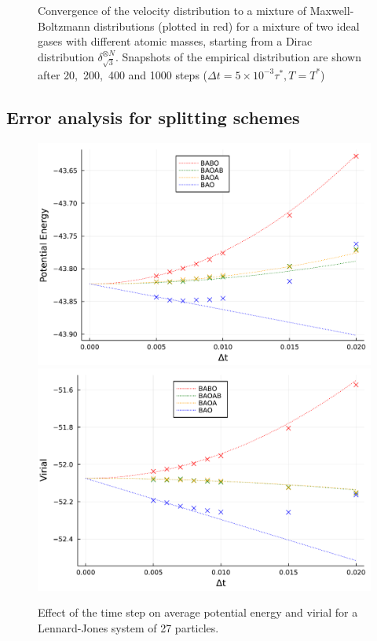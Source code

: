 \begin{figure}[htbp]
\begin{center}
          \caption{ \label{fig:velocity_histograms}
            Convergence of the velocity distribution to a mixture of Maxwell-Boltzmann distributions (plotted in red) for a mixture of two ideal gases with different atomic masses, starting from a Dirac distribution $\delta_{\sqrt 3}^{\otimes N}$. Snapshots of the empirical distribution are shown after 20,\ 200,\ 400 and 1000 steps ($\Delta t=5\times 10^{-3} \tau ^*, T=T^*$)          }
        \end{center}
      \end{figure}


\subsection{Error analysis for splitting schemes}
\begin{figure}[htbp]
    \begin{center}
      \includegraphics[width=0.49\linewidth]{figures/chapter1/potential_energy_bias.pdf}
      \includegraphics[width=0.49\linewidth]{figures/chapter1/virial_bias.pdf}
      \caption{ \label{fig:configurational_bias}
        Effect of the time step on average potential energy and virial for a Lennard-Jones system of 27 particles.
      }
    \end{center}
  \end{figure}

